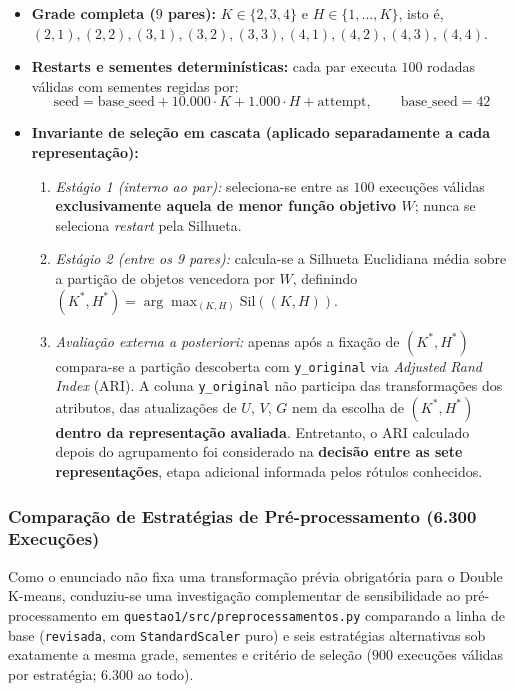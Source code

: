 \documentclass[a4paper,11pt]{article}
\begin{document}
\begin{itemize}[leftmargin=1.5em, itemsep=0.25em, topsep=0.25em]
  \item \textbf{Grade completa ($9$ pares):} $K \in \{2, 3, 4\}$ e $H \in \{1, \ldots, K\}$, isto é, $(2,1),\allowbreak (2,2),\allowbreak (3,1),\allowbreak (3,2),\allowbreak (3,3),\allowbreak (4,1),\allowbreak (4,2),\allowbreak (4,3),\allowbreak (4,4)$.
  \item \textbf{Restarts e sementes determinísticas:} cada par executa $100$ rodadas válidas com sementes regidas por:
\[
\text{seed} = \text{base\_seed} + 10.000 \cdot K + 1.000 \cdot H + \text{attempt}, \qquad \text{base\_seed} = 42
\]
  \item \textbf{Invariante de seleção em cascata (aplicado separadamente a cada representação):}
\begin{enumerate}[leftmargin=1.5em, itemsep=0.25em, topsep=0.25em]
  \item \textit{Estágio 1 (interno ao par):} seleciona-se entre as $100$ execuções válidas \textbf{exclusivamente aquela de menor função objetivo $W$}; nunca se seleciona \textit{restart} pela Silhueta.
  \item \textit{Estágio 2 (entre os 9 pares):} calcula-se a Silhueta Euclidiana média sobre a partição de objetos vencedora por $W$, definindo $(K^*, H^*) = \arg\max_{(K,H)} \text{Sil}((K,H))$.
  \item \textit{Avaliação externa a posteriori:} apenas após a fixação de $(K^*, H^*)$ compara-se a partição descoberta com \texttt{y\_\allowbreak original} via \textit{Adjusted Rand Index} (ARI). A coluna \texttt{y\_\allowbreak original} não participa das transformações dos atributos, das atualizações de $U$, $V$, $G$ nem da escolha de $(K^*, H^*)$ \textbf{dentro da representação avaliada}. Entretanto, o ARI calculado depois do agrupamento foi considerado na \textbf{decisão entre as sete representações}, etapa adicional informada pelos rótulos conhecidos.
\end{enumerate}
\end{itemize}
\subsubsection{Comparação de Estratégias de Pré-processamento (6.300 Execuções)}\label{sec:2-1-3-comparacao-de-estrategias-de-pre-processamento-6-300-execucoes}


Como o enunciado não fixa uma transformação prévia obrigatória para o Double K-means, conduziu-se uma investigação complementar de sensibilidade ao pré-processamento em \texttt{questao1/\allowbreak src/\allowbreak preprocessamentos.py} comparando a linha de base (\texttt{revisada}, com \texttt{StandardScaler} puro) e seis estratégias alternativas sob exatamente a mesma grade, sementes e critério de seleção ($900$ execuções válidas por estratégia; $6.300$ ao todo).
\end{document}
